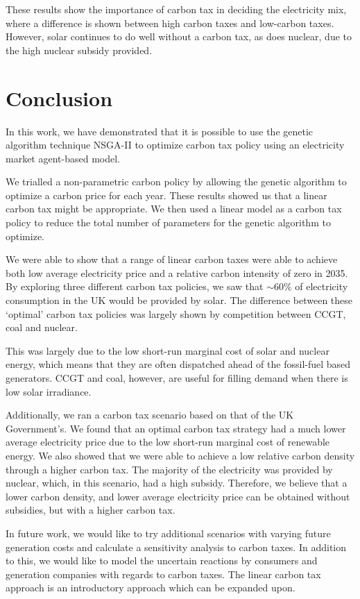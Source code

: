 These results show the importance of carbon tax in deciding the electricity mix, where a difference is shown between high carbon taxes and low-carbon taxes. However, solar continues to do well without a carbon tax, as does nuclear, due to the high nuclear subsidy provided. 




\section{Conclusion}
\label{carbonoptim:sec:conclusion}



In this work, we have demonstrated that it is possible to use the genetic algorithm technique NSGA-II to optimize carbon tax policy using an electricity market agent-based model. 

We trialled a non-parametric carbon policy by allowing the genetic algorithm to optimize a carbon price for each year. These results showed us that a linear carbon tax might be appropriate. We then used a linear model as a carbon tax policy to reduce the total number of parameters for the genetic algorithm to optimize.  

We were able to show that a range of linear carbon taxes were able to achieve both low average electricity price and a relative carbon intensity of zero in 2035. By exploring three different carbon tax policies, we saw that ${\sim}$60\% of electricity consumption in the UK would be provided by solar. The difference between these `optimal' carbon tax policies was largely shown by competition between CCGT, coal and nuclear.

This was largely due to the low short-run marginal cost of solar and nuclear energy, which means that they are often dispatched ahead of the fossil-fuel based generators. CCGT and coal, however, are useful for filling demand when there is low solar irradiance.

Additionally, we ran a carbon tax scenario based on that of the UK Government's. We found that an optimal carbon tax strategy had a much lower average electricity price due to the low short-run marginal cost of renewable energy. We also showed that we were able to achieve a low relative carbon density through a higher carbon tax. The majority of the electricity was provided by nuclear, which, in this scenario, had a high subsidy. Therefore, we believe that a lower carbon density, and lower average electricity price can be obtained without subsidies, but with a higher carbon tax. 

In future work, we would like to try additional scenarios with varying future generation costs and calculate a sensitivity analysis to carbon taxes. In addition to this, we would like to model the uncertain reactions by consumers and generation companies with regards to carbon taxes. The linear carbon tax approach is an introductory approach which can be expanded upon.

